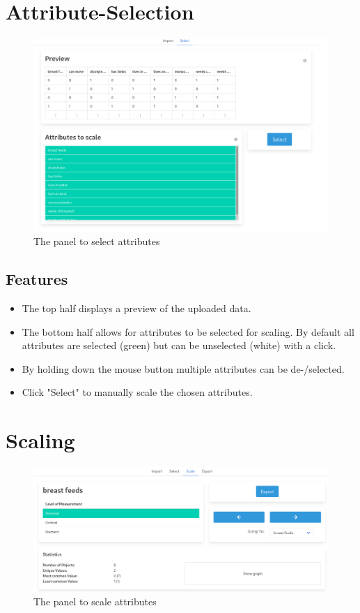 \documentclass[]{article}
\begin{document}
\section{Attribute-Selection}
\begin{figure}[H]
	\includegraphics[width=\linewidth]{images/selection.png}
	\caption{The panel to select attributes}
	\label{fig:p1}
\end{figure}
\subsection{Features}
\begin{itemize}
    \item The top half displays a preview of the uploaded data.
    \item The bottom half allows for attributes to be selected for scaling. By default all attributes are selected (green) but can be unselected (white) with a click.
    \item By holding down the mouse button  multiple attributes can be de-/selected.
    \item Click "Select" to manually scale the chosen attributes.
\end{itemize}

\section{Scaling}
\begin{figure}[H]
	\includegraphics[width=\linewidth]{images/nominal.png}
	\caption{The panel to scale attributes}
	\label{fig:p3}
\end{figure}
\end{document}
